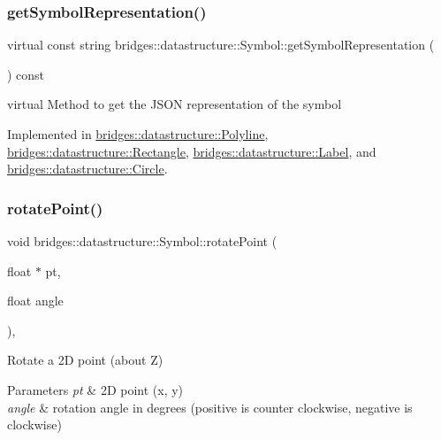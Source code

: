 \subsubsection{\texorpdfstring{get\+Symbol\+Representation()}{getSymbolRepresentation()}}
{\footnotesize\ttfamily virtual const string bridges\+::datastructure\+::\+Symbol\+::get\+Symbol\+Representation (\begin{DoxyParamCaption}{ }\end{DoxyParamCaption}) const\hspace{0.3cm}{\ttfamily [pure virtual]}}

virtual Method to get the J\+S\+ON representation of the symbol 

Implemented in \mbox{\hyperlink{classbridges_1_1datastructure_1_1_polyline_a176c06400a3b105fa651c69891381201}{bridges\+::datastructure\+::\+Polyline}}, \mbox{\hyperlink{classbridges_1_1datastructure_1_1_rectangle_ada89ed40d2515a3518084f5460ba8dac}{bridges\+::datastructure\+::\+Rectangle}}, \mbox{\hyperlink{classbridges_1_1datastructure_1_1_label_aa3b7c9e5630ecc8a2534e6db2a220e90}{bridges\+::datastructure\+::\+Label}}, and \mbox{\hyperlink{classbridges_1_1datastructure_1_1_circle_a796c88ccb8c5529d45aa7271a34fa3fe}{bridges\+::datastructure\+::\+Circle}}.

\mbox{\label{classbridges_1_1datastructure_1_1_symbol_ad40678e04bae69b4c03881148678e71e}} 
\subsubsection{\texorpdfstring{rotate\+Point()}{rotatePoint()}}
{\footnotesize\ttfamily void bridges\+::datastructure\+::\+Symbol\+::rotate\+Point (\begin{DoxyParamCaption}\item[{float $\ast$}]{pt,  }\item[{float}]{angle }\end{DoxyParamCaption})\hspace{0.3cm}{\ttfamily [inline]}, {\ttfamily [protected]}}



Rotate a 2D point (about Z) 


\begin{DoxyParams}{Parameters}
{\em pt} & 2D point (x, y) \\
\hline
{\em angle} & rotation angle in degrees (positive is counter clockwise, negative is clockwise) \\
\hline
\end{DoxyParams}
\mbox{\label{classbridges_1_1datastructure_1_1_symbol_ac27131f6461a763e55f1127f3cf87932}} 
